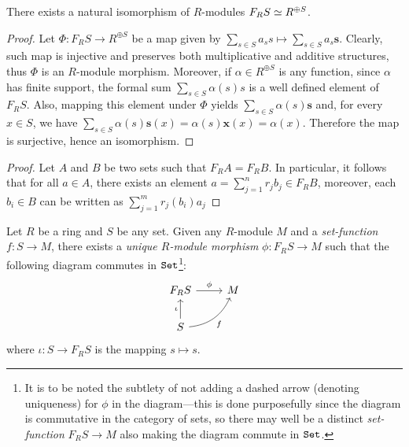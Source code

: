 \begin{proposition}
\label{prop:free-module-structure-isomorphism}
There exists a natural isomorphism of \(R\)-modules \(F_R S \simeq R^{\oplus S}\).
\end{proposition}

\begin{proof}
Let \(\Phi: F_R S \to R^{\oplus S}\) be a map given by
\(\sum_{s \in S} a_s s \mapsto \sum_{s \in S} a_s \mathbf{s}\). Clearly, such
map is injective and preserves both multiplicative and additive structures, thus
\(\Phi\) is an \(R\)-module morphism. Moreover, if \(\alpha \in R^{\oplus S}\)
is any function, since \(\alpha\) has finite support, the formal sum
\(\sum_{s \in S} \alpha(s) s\) is a well defined element of \(F_R S\). Also,
mapping this element under \(\Phi\) yields
\(\sum_{s \in S} \alpha(s) \mathbf{s}\) and, for every \(x \in S\), we have
\(\sum_{s \in S} \alpha(s) \mathbf{s}(x) = \alpha(s) \mathbf{x}(x) =
\alpha(x)\). Therefore the map is surjective, hence an isomorphism.
\end{proof}

\begin{proof}
Let \(A\) and \(B\) be two sets such that \(F_R A = F_R B\). In particular, it
follows that for all \(a \in A\), there exists an element \(a = \sum_{j=1}^n r_j
b_j \in F_R B\), moreover, each \(b_i \in B\) can be written as \(\sum_{j=1}^m
r_j(b_i) a_j\)
\end{proof}

\begin{proposition}
\label{prop:free-mod-univ-prop}
Let \(R\) be a ring and \(S\) be any set. Given any \(R\)-module \(M\) and a
\emph{set-function} \(f: S \to M\), there exists a \emph{unique \(R\)-module
  morphism} \(\phi: F_R S \to M\) such that the following diagram commutes in
\({\texttt{Set}}\)\footnote{It is to be noted the subtlety of not adding a dashed arrow
  (denoting uniqueness) for \(\phi\) in the diagram---this is done purposefully
  since the diagram is commutative in the category of sets, so there may well be
  a distinct \emph{set-function} \(F_R S \to M\) also making the diagram commute
  in \({\texttt{Set}}\).}:
\[
\begin{tikzcd}
F_R S \ar[r, "\phi"] &M \\
S \ar[u, "\iota"] \ar[ru, "f"', bend right] &
\end{tikzcd}
\]
where \(\iota: S \to F_R S\) is the mapping \(s \mapsto s\).
\end{proposition}

